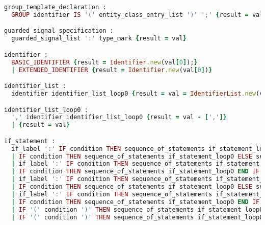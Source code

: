 \begin{lstlisting}[language=Ruby, style=rubystyle]
group_template_declaration :
  GROUP identifier IS '(' entity_class_entry_list ')' ';' {result = val}

guarded_signal_specification :
  guarded_signal_list ':' type_mark {result = val}

identifier :
  BASIC_IDENTIFIER {result = Identifier.new(val[0]);}
  | EXTENDED_IDENTIFIER {result = Identifier.new(val[0])}

identifier_list :
  identifier identifier_list_loop0 {result = val = IdentifierList.new(val.flatten); InitializeRepository.add(result.identifiers) }

identifier_list_loop0 :
  ',' identifier identifier_list_loop0 {result = val - [',']}
  | {result = val}

if_statement :
  if_label ':' IF condition THEN sequence_of_statements if_statement_loop0 ELSE sequence_of_statements END IF if_label ';' {result = IfStatement.new(val[0], val[3], val[5..6], val[8], val[9...val.length-1])}
  | IF condition THEN sequence_of_statements if_statement_loop0 ELSE sequence_of_statements END IF if_label ';' {result = IfStatement.new(nil, val[1], val[3..4], val[6], val[7...val.length-1])}
  | if_label ':' IF condition THEN sequence_of_statements if_statement_loop0 END IF if_label ';' {result = IfStatement.new(val[0], val[3], val[5..6], nil, val[9...val.length-1])}
  | IF condition THEN sequence_of_statements if_statement_loop0 END IF if_label ';' {result = IfStatement.new(nil, val[1], val[3..4], nil, val[5...val.length-1])}
  | if_label ':' IF condition THEN sequence_of_statements if_statement_loop0 ELSE sequence_of_statements END IF ';' {result = IfStatement.new(val[0], val[3], val[5..6], val[8], val[9...val.length-1])}
  | IF condition THEN sequence_of_statements if_statement_loop0 ELSE sequence_of_statements END IF ';' {result = IfStatement.new(nil, val[1], val[3..4], val[6], val[7...val.length-1])}
  | if_label ':' IF condition THEN sequence_of_statements if_statement_loop0 END IF ';' {result = IfStatement.new(val[0], val[3], val[5..6], nil, val[7...val.length-1])}
  | IF condition THEN sequence_of_statements if_statement_loop0 END IF ';' {result = IfStatement.new(nil, val[1], val[3..4], nil, val[5...val.length-1])}
  | IF '(' condition ')' THEN sequence_of_statements if_statement_loop0 END IF ';' {result = IfStatement.new(nil, val[2], val[5..6], nil, val[7...val.length-1]);}
  | IF '(' condition ')' THEN sequence_of_statements if_statement_loop0 ELSE sequence_of_statements END IF ';' {result = IfStatement.new(nil, val[2], val[5..6], val[8], val[9...val.length-1]);}


\end{lstlisting}
